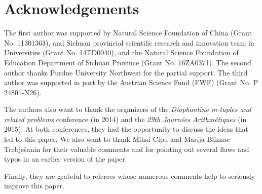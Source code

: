 \documentclass{amsart}
\theoremstyle{definition}
\begin{document}
\section*{Acknowledgements} The first author was supported by Natural Science Foundation of China (Grant No. 11301363), 
and Sichuan provincial scientific research and innovation team in Universities (Grant No. 14TD0040), and the Natural Science 
Foundation of Education Department of Sichuan Province (Grant No. 16ZA0371). The second author thanks Purdue University Northwest
for the partial support. The third author was supported in part by the Austrian Science Fund (FWF) (Grant No. P 24801-N26). 

The authors also want to thank the organizers of the {\it Diophantine m-tuples and related problems} conference (in 2014) and the {\it 29th Journ\'ees Arithm\'etiques }(in 2015). At both conferences, they had the opportunity to discuss the ideas that led to this paper. We also want to thank Mihai Cipu and Marija Bliznac Trebje\v{s}anin for their valuable comments and for pointing out several flaws and typos in an earlier version of the paper.

Finally, they are grateful to referees whose numerous comments help to seriously improve this paper.
\end{document}
